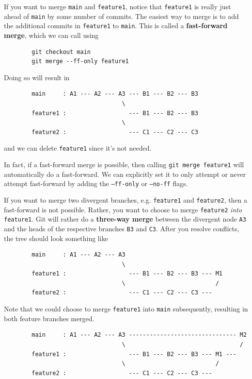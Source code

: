     \begin{definition}
      If you want to merge \texttt{main} and \texttt{feature1}, notice that \texttt{feature1} is really just ahead of \texttt{main} by some number of commits. The easiest way to merge is to add the additional commits in \texttt{feature1} to \texttt{main}. This is called a \textbf{fast-forward merge}, which we can call using 
      \begin{lstlisting}
        git checkout main 
        git merge --ff-only feature1
      \end{lstlisting} 
      Doing so will result in 
      \begin{lstlisting}
        main     : A1 --- A2 --- A3 --- B1 --- B2 --- B3
                                  \
        feature1 :                  --- B1 --- B2 --- B3
                                  \
        feature2 :                  --- C1 --- C2 --- C3
      \end{lstlisting}
      and we can delete \texttt{feature1} since it's not needed. 
    \end{definition}

    In fact, if a fast-forward merge is possible, then calling \texttt{git merge feature1} will automatically do a fast-forward. We can explicitly set it to only attempt or never attempt fast-forward by adding the \texttt{--ff-only} or \texttt{--no-ff} flags. 

    \begin{definition}
      If you want to merge two divergent branches, e.g. \texttt{feature1} and \texttt{feature2}, then a fast-forward is not possible. Rather, you want to choose to merge \texttt{feature2} \textit{into} \texttt{feature1}. Git will rather do a \textbf{three-way merge} between the divergent node \texttt{A3} and the heads of the respective branches \texttt{B3} and \texttt{C3}. After you resolve conflicts, the tree should look something like 
      \begin{lstlisting}
        main     : A1 --- A2 --- A3
                                  \
        feature1 :                  --- B1 --- B2 --- B3 --- M1
                                  \                          /
        feature2 :                  --- C1 --- C2 --- C3 ---
      \end{lstlisting}
      Note that we could choose to merge \texttt{feature1} into \texttt{main} subsequently, resulting in both feature branches merged. 
      \begin{lstlisting}
        main     : A1 --- A2 --- A3 ------------------------------- M2
                                  \                                 /
        feature1 :                  --- B1 --- B2 --- B3 --- M1 ---
                                  \                          /
        feature2 :                  --- C1 --- C2 --- C3 ---
      \end{lstlisting}
    \end{definition}

